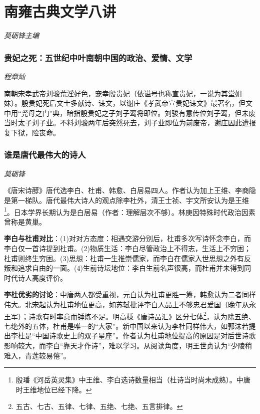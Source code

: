 \chapter{南雍古典文学八讲}
\par \Large \emph{莫砺锋主编} \normalsize

\subsection*{贵妃之死：五世纪中叶南朝中国的政治、爱情、文学}

\emph{程章灿}

南朝宋孝武帝刘骏荒淫好色，宠幸殷贵妃（依谥号也称宣贵妃，一说为其堂姐妹）。殷贵妃死后文士多献诗、诔文，以谢庄《孝武帝宣贵妃诔文》最著名，但文中用“尧母之门”典，暗指殷贵妃之子刘子鸾将即位。刘骏有意传位刘子鸾，但未废当时太子刘子业。不料刘骏两年后突然死去，刘子业即位为前废帝，谢庄因此遭报复下狱，险丧命。


\subsection*{谁是唐代最伟大的诗人}

\emph{莫砺锋}

\par 《唐宋诗醇》唐代选李白、杜甫、韩愈、白居易四人。作者认为加上王维、李商隐是第一梯队。唐代最伟大诗人的观点除李杜外，清王士祯、宇文所安认为是王维\footnote{殷{璠}《河岳英灵集》中王维、李白选诗数量相当（杜诗当时尚未成熟）。中唐时王维地位已经下降。}。日本学界长期认为是白居易（作者：理解层次不够）。林庚因特殊时代政治因素曾称是黄巢。

\par \textbf{李白与杜甫对比}：(1)对对方态度：相遇交游分别后，杜甫多次写诗怀念李白，而李白仅一首诗提到杜甫。(2)物质生活：李白尽管政治上不得志，生活上不穷困；杜甫则终生穷困。(3)思想：杜甫一生推崇儒家，而李白在儒家入世思想之外有反叛和追求自由的一面。(4)生前诗坛地位：李白生前名声很高，而杜甫并未得到同时代诗人高度评价。

\par \textbf{李杜优劣的讨论}：中唐两人都受重视，元白认为杜甫更胜一筹，韩愈认为二者同样伟大。北宋起认为杜甫地位更高，如苏轼批评李白人品上不够忠君爱国（晚年从永王军）；诗歌有时率意而锤炼不足。明高{棅}《唐诗品汇》区分七体\footnote{五古、七古、五律、七律、五绝、七绝、五言排律。}，认为除五绝、七绝外的五体，杜甫是唯一的“大家”。新中国以来认为李杜同样伟大，如郭沫若提出李杜是“中国诗歌史上的双子星座”。作者认为杜甫地位提高的原因是对后世诗歌影响较大，而李白“靠天才作诗”，难以学习。从阅读角度，明王世贞认为“少陵稍难入，青莲较易倦”。
